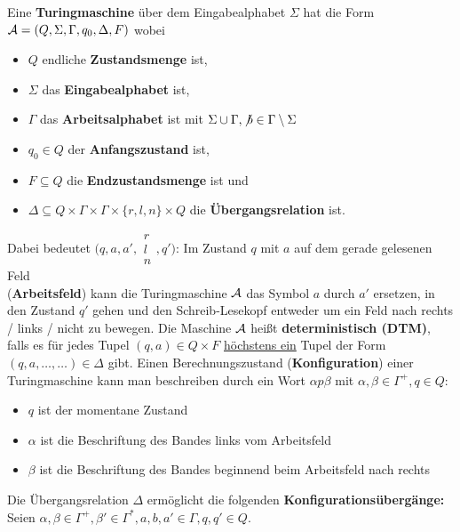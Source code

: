 \begin{definition}\label{def11.1}
	Eine \textbf{Turingmaschine} über dem Eingabealphabet $\Sigma$ hat die Form $\A=(Q,\Sigma,\Gamma,q_0,\Delta,F)$ wobei
	\begin{itemize}
		\item $Q$ endliche \textbf{Zustandsmenge} ist,
		\item $\Sigma$ das \textbf{Eingabealphabet} ist,
		\item $\Gamma$ das \textbf{Arbeitsalphabet} ist mit $\Sigma\cup\Gamma,\nb\in\Gamma\setminus\Sigma$
		\item $q_0\in Q$ der \textbf{Anfangszustand} ist,
		\item $F\subseteq Q$ die \textbf{Endzustandsmenge} ist und 
		\item $\Delta\subseteq Q\times\Gamma\times\Gamma\times\lbrace r,l,n\rbrace\times Q$ die \textbf{Übergangsrelation} ist.
	\end{itemize}
	Dabei bedeutet $\big(q,a,a',\begin{matrix}
		r\\
		l\\
		n
	\end{matrix},q'\big)$:
	Im Zustand $q$ mit $a$ auf dem gerade gelesenen Feld\\ (\textbf{Arbeitsfeld}) kann die Turingmaschine $\A$ das Symbol $a$ durch $a'$ ersetzen, in den Zustand $q'$ gehen und den Schreib-Lesekopf entweder um ein Feld nach rechts / links / nicht zu bewegen.\nl
	Die Maschine $\A$ heißt \textbf{deterministisch (DTM)}, falls es für jedes Tupel $(q,a)\in Q\times F$ \underline{höchstens ein} Tupel der Form $(q,a,\ldots,\ldots)\in\Delta$ gibt.\nl
	Einen Berechnungszustand (\textbf{Konfiguration}) einer Turingmaschine kann man beschreiben durch ein Wort $\alpha p\beta$ mit $\alpha,\beta\in\Gamma^+,q\in Q$:
	\begin{itemize}
		\item $q$ ist der momentane Zustand
		\item $\alpha$ ist die Beschriftung des Bandes links vom Arbeitsfeld
		\item $\beta$ ist die Beschriftung des Bandes beginnend beim Arbeitsfeld nach rechts
	\end{itemize}
	Die Übergangsrelation $\Delta$ ermöglicht die folgenden \textbf{Konfigurationsübergänge:}\\
	Seien $\alpha,\beta\in\Gamma^+,\beta'\in\Gamma^\ast,a,b,a'\in\Gamma,q,q'\in Q$.
	\begin{itemize}
		\item $\begin{aligned}

\end{aligned}
\end{itemize}
\end{definition}

